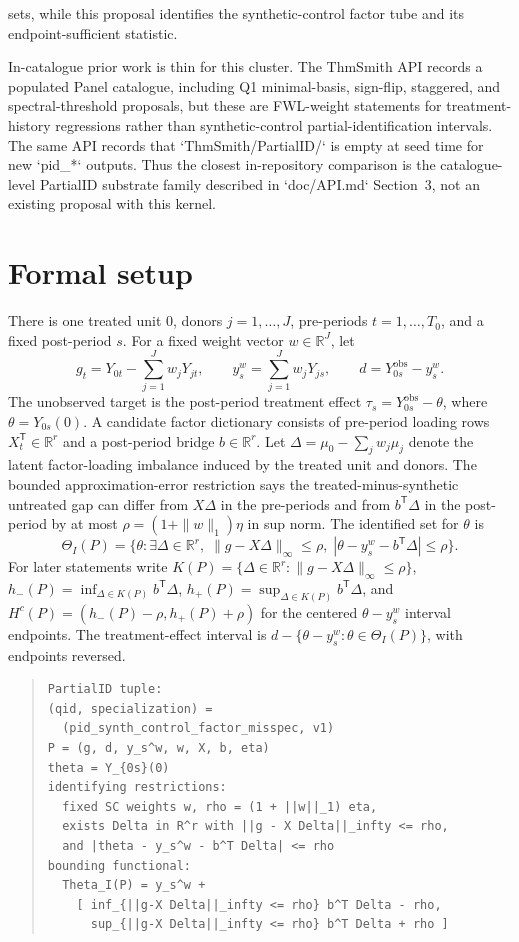 \documentclass[11pt]{article}
\newcommand{\transpose}{\mathsf{T}}
\newcommand{\R}{\mathbb{R}}
\theoremstyle{definition}
\theoremstyle{plain}
\theoremstyle{remark}
\begin{document}
sets, while this proposal identifies the synthetic-control factor tube and its endpoint-sufficient statistic.

In-catalogue prior work is thin for this cluster. The ThmSmith API records a populated Panel catalogue, including Q1 minimal-basis, sign-flip, staggered, and spectral-threshold proposals, but these are FWL-weight statements for treatment-history regressions rather than synthetic-control partial-identification intervals. The same API records that `ThmSmith/PartialID/` is empty at seed time for new `pid_*` outputs. Thus the closest in-repository comparison is the catalogue-level PartialID substrate family described in `doc/API.md` Section~3, not an existing proposal with this kernel.

\section{Formal setup}
There is one treated unit \(0\), donors \(j=1,\ldots,J\), pre-periods \(t=1,\ldots,T_0\), and a fixed post-period \(s\). For a fixed weight vector \(w\in\R^J\), let
\[
g_t=Y_{0t}-\sum_{j=1}^J w_jY_{jt},\qquad
y_s^w=\sum_{j=1}^J w_jY_{js},\qquad
d=Y_{0s}^{\mathrm{obs}}-y_s^w.
\]
The unobserved target is the post-period treatment effect \(\tau_s=Y_{0s}^{\mathrm{obs}}-\theta\), where \(\theta=Y_{0s}(0)\). A candidate factor dictionary consists of pre-period loading rows \(X_t^\transpose\in\R^r\) and a post-period bridge \(b\in\R^r\). Let \(\Delta=\mu_0-\sum_j w_j\mu_j\) denote the latent factor-loading imbalance induced by the treated unit and donors. The bounded approximation-error restriction says the treated-minus-synthetic untreated gap can differ from \(X\Delta\) in the pre-periods and from \(b^\transpose\Delta\) in the post-period by at most \(\rho=(1+\|w\|_1)\eta\) in sup norm. The identified set for \(\theta\) is
\[
\Theta_I(P)=
\{\theta:\exists \Delta\in\R^r,\; \|g-X\Delta\|_\infty\le\rho,\;
|\theta-y_s^w-b^\transpose\Delta|\le\rho\}.
\]
For later statements write \(K(P)=\{\Delta\in\R^r:\|g-X\Delta\|_\infty\le\rho\}\), \(h_-(P)=\inf_{\Delta\in K(P)}b^\transpose\Delta\), \(h_+(P)=\sup_{\Delta\in K(P)}b^\transpose\Delta\), and \(H^c(P)=(h_-(P)-\rho,h_+(P)+\rho)\) for the centered \(\theta-y_s^w\) interval endpoints. The treatment-effect interval is \(d-\{\theta-y_s^w:\theta\in\Theta_I(P)\}\), with endpoints reversed.

\begin{quote}
\begin{verbatim}
PartialID tuple:
(qid, specialization) =
  (pid_synth_control_factor_misspec, v1)
P = (g, d, y_s^w, w, X, b, eta)
theta = Y_{0s}(0)
identifying restrictions:
  fixed SC weights w, rho = (1 + ||w||_1) eta,
  exists Delta in R^r with ||g - X Delta||_infty <= rho,
  and |theta - y_s^w - b^T Delta| <= rho
bounding functional:
  Theta_I(P) = y_s^w +
    [ inf_{||g-X Delta||_infty <= rho} b^T Delta - rho,
      sup_{||g-X Delta||_infty <= rho} b^T Delta + rho ]
\end{verbatim}
\end{quote}
\end{document}
